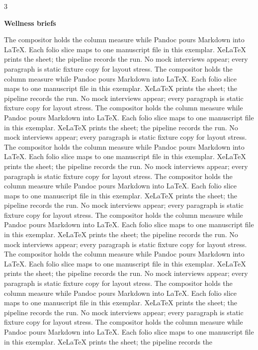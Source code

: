\documentclass[
]{article}
\begin{document}
\begin{multicols}{3}

\textbf{Wellness briefs}

The compositor holds the column measure while Pandoc pours Markdown into
LaTeX. Each folio slice maps to one manuscript file in this exemplar.
XeLaTeX prints the sheet; the pipeline records the run. No mock
interviews appear; every paragraph is static fixture copy for layout
stress. The compositor holds the column measure while Pandoc pours
Markdown into LaTeX. Each folio slice maps to one manuscript file in
this exemplar. XeLaTeX prints the sheet; the pipeline records the run.
No mock interviews appear; every paragraph is static fixture copy for
layout stress. The compositor holds the column measure while Pandoc
pours Markdown into LaTeX. Each folio slice maps to one manuscript file
in this exemplar. XeLaTeX prints the sheet; the pipeline records the
run. No mock interviews appear; every paragraph is static fixture copy
for layout stress. The compositor holds the column measure while Pandoc
pours Markdown into LaTeX. Each folio slice maps to one manuscript file
in this exemplar. XeLaTeX prints the sheet; the pipeline records the
run. No mock interviews appear; every paragraph is static fixture copy
for layout stress. The compositor holds the column measure while Pandoc
pours Markdown into LaTeX. Each folio slice maps to one manuscript file
in this exemplar. XeLaTeX prints the sheet; the pipeline records the
run. No mock interviews appear; every paragraph is static fixture copy
for layout stress. The compositor holds the column measure while Pandoc
pours Markdown into LaTeX. Each folio slice maps to one manuscript file
in this exemplar. XeLaTeX prints the sheet; the pipeline records the
run. No mock interviews appear; every paragraph is static fixture copy
for layout stress. The compositor holds the column measure while Pandoc
pours Markdown into LaTeX. Each folio slice maps to one manuscript file
in this exemplar. XeLaTeX prints the sheet; the pipeline records the
run. No mock interviews appear; every paragraph is static fixture copy
for layout stress. The compositor holds the column measure while Pandoc
pours Markdown into LaTeX. Each folio slice maps to one manuscript file
in this exemplar. XeLaTeX prints the sheet; the pipeline records the
run. No mock interviews appear; every paragraph is static fixture copy
for layout stress. The compositor holds the column measure while Pandoc
pours Markdown into LaTeX. Each folio slice maps to one manuscript file
in this exemplar. XeLaTeX prints the sheet; the pipeline records the

\end{multicols}
\end{document}
